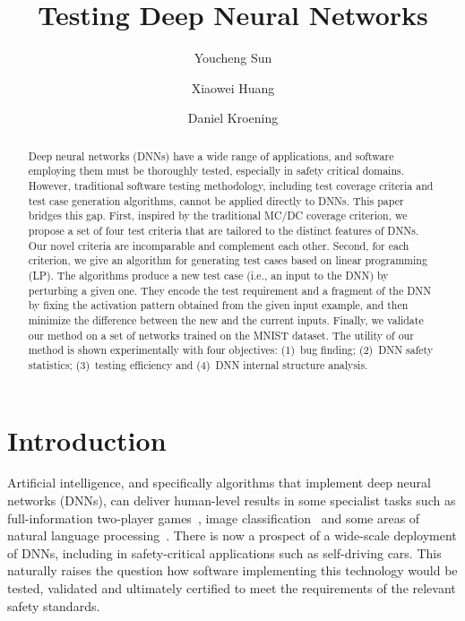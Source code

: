 \documentclass[runningheads,a4paper]{llncs}
\begin{document}
\title{Testing Deep Neural Networks}

\author{Youcheng Sun \and Xiaowei Huang \and Daniel Kroening}


\maketitle

\newcommand\true{\textsf{true}\xspace}
\newcommand\false{\textsf{false}\xspace}

\begin{abstract}
Deep neural networks (DNNs) have a wide range of applications, and software
employing them must be thoroughly tested, especially in safety
critical domains.  However, traditional software testing methodology,
including test coverage criteria and test case generation algorithms, cannot
be applied directly to DNNs.  This paper bridges this gap.  First, inspired
by the traditional MC/DC coverage criterion, we propose a set of four test
criteria that are tailored to the distinct features of DNNs.  Our novel
criteria are incomparable and complement each other.  Second, for each
criterion, we give an algorithm for generating test cases based on linear
programming (LP).  The algorithms produce a new test case (i.e., an input to
the DNN) by perturbing a given one.  They encode the test requirement and a
fragment of the DNN by fixing the activation pattern obtained from the given
input example, and then minimize the difference between the new and the
current inputs.  Finally, we validate our method on a set of networks
trained on the MNIST dataset.  The utility of our method is shown
experimentally with four objectives: (1)~bug finding; (2)~DNN safety
statistics; (3)~testing efficiency and (4)~DNN internal structure analysis.
\end{abstract}


\section{Introduction}

Artificial intelligence, and specifically algorithms that implement deep
neural networks (DNNs), can deliver human-level results in some specialist
tasks such as full-information two-player games~\cite{alphaGoZero}, image
classification~\cite{imageNetChallenge} and some areas of natural language
processing~\cite{Goldberg2016}.  There is now a prospect of a wide-scale
deployment of DNNs, including in safety-critical applications such as
self-driving cars.  This naturally raises the question how software
implementing this technology would be tested, validated and ultimately
certified to meet the requirements of the relevant safety standards.
\end{document}
